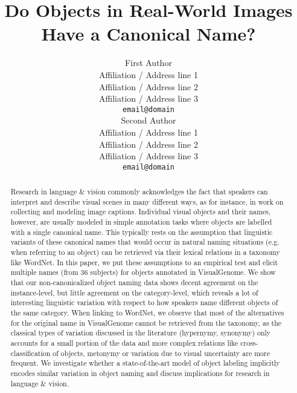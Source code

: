 \documentclass[11pt,a4paper]{article}
\title{Do Objects in Real-World Images Have a Canonical Name?}
\author{First Author \\
  Affiliation / Address line 1 \\
  Affiliation / Address line 2 \\
  Affiliation / Address line 3 \\
  {\tt email@domain} \\\And
  Second Author \\
  Affiliation / Address line 1 \\
  Affiliation / Address line 2 \\
  Affiliation / Address line 3 \\
  {\tt email@domain} \\}
\date{}
\begin{document}
\maketitle

\begin{abstract}
Research in language \& vision commonly acknowledges the fact that speakers can interpret and describe visual scenes in many different ways, as for instance, in work on collecting and modeling image captions. 
Individual visual objects and their names, however, are usually modeled in simple annotation tasks where objects are labelled with a single canonical name. 
This typically rests on the assumption that linguistic variants of these canonical names that would occur in natural naming situations (e.g. when referring to an object) can be retrieved via their lexical relations in a taxonomy like WordNet.
In this paper, we put these assumptions 
to an empirical test and elicit multiple names (from 36 subjects) for objects annotated in VisualGenome.
We show that our non-canonicalized object naming data shows decent agreement on the instance-level, but little agreement on the category-level, which reveals a lot of interesting linguistic variation with respect to how speakers name different objects of the same category.
When linking to WordNet, we observe that most of the alternatives for the original name in VisualGenome cannot be retrieved from the taxonomy, as the classical types of variation discussed in the literature (hypernymy, synonymy) only accounts for a small portion of the data and
more complex relations like cross-classification of objects, metonymy or variation due to visual uncertainty are more frequent.
We investigate whether a state-of-the-art model of object labeling implicitly encodes similar variation in object naming and discuss implications for research in language \& vision.
\end{abstract}
\end{document}
